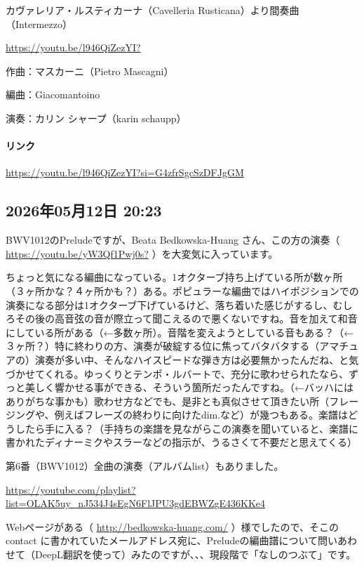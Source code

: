 カヴァレリア・ルスティカーナ（Cavelleria Rusticana）より間奏曲（Intermezzo）

\url{https://youtu.be/l946QiZezYI?}

作曲：マスカーニ（Pietro Mascagni）

編曲：Giacomantoino

演奏：カリン シャープ（karin schaupp）

\paragraph{リンク}
\url{https://youtu.be/l946QiZezYI?si=G4zfrSgcSzDFJgGM}

\subsection*{2026年05月12日 20:23}

BWV1012のPreludeですが、Beata Bedkowska-Huang さん、この方の演奏（ \url{https://youtu.be/yW3Qf1Pwj0s?} ）を大変気に入っています。

ちょっと気になる編曲になっている。1オクターブ持ち上げている所が数ヶ所（３ヶ所かな？４ヶ所かも？）ある。ポピュラーな編曲ではハイポジションでの演奏になる部分は1オクターブ下げているけど、落ち着いた感じがするし、むしろその後の高音弦の音が際立って聞こえるので悪くないですね。音を加えて和音にしている所がある（←多数ヶ所）。音階を変えようとしている音もある？（←３ヶ所？）特に終わりの方、演奏が破綻する位に焦ってバタバタする（アマチュアの）演奏が多い中、そんなハイスピードな弾き方は必要無かったんだね、と気づかせてくれる。ゆっくりとテンポ・ルバートで、充分に歌わせられたなら、ずっと美しく響かせる事ができる、そういう箇所だったんですね。（←バッハにはありがちな事かも）歌わせ方などでも、是非とも真似させて頂きたい所（フレージングや、例えばフレーズの終わりに向けたdim.など）が幾つもある。楽譜はどうしたら手に入る？（手持ちの楽譜を見ながらこの演奏を聞いていると、楽譜に書かれたディナーミクやスラーなどの指示が、うるさくて不要だと思えてくる）

第6番（BWV1012）全曲の演奏（アルバムlist）もありました。

\url{https://youtube.com/playlist?list=OLAK5uy_nJ534J4sEgN6FlJPU3gdEBWZgE436KKe4}

Webページがある（ \url{http://bedkowska-huang.com/} ）様でしたので、そこのcontact に書かれていたメールアドレス宛に、Preludeの編曲譜について問いあわせて（DeepL翻訳を使って）みたのですが、、、現段階で「なしのつぶて」です。

